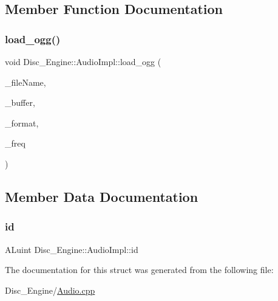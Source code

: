 \subsection{Member Function Documentation}
\mbox{\label{struct_disc___engine_1_1_audio_impl_a94e1969559357e6e645b29b81a566fb5}} 
\subsubsection{\texorpdfstring{load\+\_\+ogg()}{load\_ogg()}}
{\footnotesize\ttfamily void Disc\+\_\+\+Engine\+::\+Audio\+Impl\+::load\+\_\+ogg (\begin{DoxyParamCaption}\item[{std\+::string}]{\+\_\+file\+Name,  }\item[{std\+::vector$<$ char $>$ \&}]{\+\_\+buffer,  }\item[{A\+Lenum \&}]{\+\_\+format,  }\item[{A\+Lsizei \&}]{\+\_\+freq }\end{DoxyParamCaption})\hspace{0.3cm}{\ttfamily [inline]}}



\subsection{Member Data Documentation}
\mbox{\label{struct_disc___engine_1_1_audio_impl_a4cfe498978d1b27d012f198829744fbb}} 
\subsubsection{\texorpdfstring{id}{id}}
{\footnotesize\ttfamily A\+Luint Disc\+\_\+\+Engine\+::\+Audio\+Impl\+::id}



The documentation for this struct was generated from the following file\+:\begin{DoxyCompactItemize}
\item 
Disc\+\_\+\+Engine/\mbox{\hyperlink{_audio_8cpp}{Audio.\+cpp}}\end{DoxyCompactItemize}
